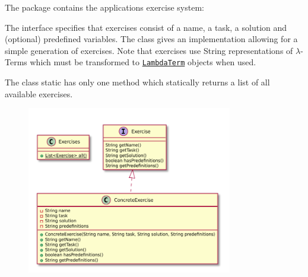 The \texttt{} package contains the applications exercise system:

The \texttt{} interface specifies that exercises consist of a name, a task, a solution and (optional) predefined variables.
The \texttt{} class gives an implementation allowing for a simple generation of exercises.
Note that exercises use String representations of $\lambda$-Terms which must be transformed to \texttt{\hyperref[type:edu.kit.wavelength.client.model.term.LambdaTerm]{LambdaTerm}} objects when used.

The \texttt{} class static has only one method which statically returns a list of all available exercises.

\begin{figure}[H]
	\centering
	\includegraphics[width=0.8\textwidth]{packageDiagrams/exercisePackage}
\end{figure}


